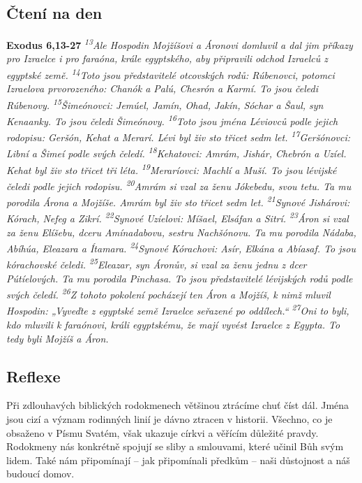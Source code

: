 \documentclass[11pt]{article}
\begin{document}
\subsection*{Čtení na den}
\textbf{Exodus 6,13-27}
\newline
\textit{
\textsuperscript{13}Ale Hospodin Mojžíšovi a Áronovi domluvil a dal jim příkazy pro Izraelce i pro faraóna, krále egyptského, aby připravili odchod Izraelců z egyptské země.
\textsuperscript{14}Toto jsou představitelé otcovských rodů: Rúbenovci, potomci Izraelova prvorozeného: Chanók a Palú, Chesrón a Karmí. To jsou čeledi Rúbenovy.
\textsuperscript{15}Šimeónovci: Jemúel, Jamín, Ohad, Jakín, Sóchar a Šaul, syn Kenaanky. To jsou čeledi Šimeónovy.
\textsuperscript{16}Toto jsou jména Léviovců podle jejich rodopisu: Geršón, Kehat a Merarí. Lévi byl živ sto třicet sedm let.
\textsuperscript{17}Geršónovci: Libní a Šimeí podle svých čeledí.
\textsuperscript{18}Kehatovci: Amrám, Jishár, Chebrón a Uzíel. Kehat byl živ sto třicet tři léta.
\textsuperscript{19}Meraríovci: Machlí a Muší. To jsou lévijské čeledi podle jejich rodopisu.
\textsuperscript{20}Amrám si vzal za ženu Jókebedu, svou tetu. Ta mu porodila Árona a Mojžíše. Amrám byl živ sto třicet sedm let.
\textsuperscript{21}Synové Jishárovi: Kórach, Nefeg a Zikrí.
\textsuperscript{22}Synové Uzíelovi: Míšael, Elsáfan a Sitrí.
\textsuperscript{23}Áron si vzal za ženu Elíšebu, dceru Amínadabovu, sestru Nachšónovu. Ta mu porodila Nádaba, Abíhúa, Eleazara a Ítamara.
\textsuperscript{24}Synové Kórachovi: Asír, Elkána a Abíasaf. To jsou kórachovské čeledi.
\textsuperscript{25}Eleazar, syn Áronův, si vzal za ženu jednu z dcer Pútíelových. Ta mu porodila Pinchasa. To jsou představitelé lévijských rodů podle svých čeledí.
\textsuperscript{26}Z tohoto pokolení pocházejí ten Áron a Mojžíš, k nimž mluvil Hospodin: „Vyveďte z egyptské země Izraelce seřazené po oddílech.“
\textsuperscript{27}Oni to byli, kdo mluvili k faraónovi, králi egyptskému, že mají vyvést Izraelce z Egypta. To tedy byli Mojžíš a Áron.
}

\subsection*{Reflexe}

Při zdlouhavých biblických rodokmenech většinou ztrácíme chuť číst dál. Jména jsou cizí a význam rodinných linií je dávno
ztracen v historii. Všechno, co je obsaženo v Písmu Svatém, však ukazuje církvi a věřícím důležité pravdy. Rodokmeny nás
konkrétně spojují se sliby a smlouvami, které učinil Bůh svým lidem. Také nám připomínají – jak připomínali předkům – naši
důstojnost a náš budoucí domov.
\end{document}
